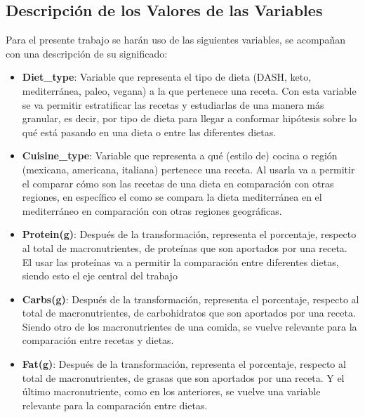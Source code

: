 \documentclass[12pt,a4paper]{article}
\begin{document}
    \subsection{Descripción de los Valores de las Variables}
    Para el presente trabajo se harán uso de las siguientes variables, se 
    acompañan con una descripción de su significado:
    \begin{itemize}[label=\textbullet]
        \item \textbf{Diet\_type}: Variable que representa el tipo de 
        dieta (DASH, keto, mediterránea, paleo, vegana) a la que 
        pertenece una receta. Con esta variable se va permitir estratificar 
        las recetas y estudiarlas de una manera más granular, es decir, 
        por tipo de dieta para llegar a conformar hipótesis sobre lo qué 
        está pasando en una dieta o entre las diferentes dietas.
        \item \textbf{Cuisine\_type}: Variable que representa a qué (estilo 
        de) cocina o región (mexicana, americana, italiana) pertenece una 
        receta. Al usarla va a permitir el comparar cómo son las recetas 
        de una dieta en comparación con otras regiones, en específico el 
        como se compara la dieta mediterránea en el mediterráneo en comparación 
        con otras regiones geográficas.
        \item \textbf{Protein(g)}: Después de la transformación, representa el 
        porcentaje, respecto al total de macronutrientes, de proteínas que son 
        aportados por una receta. El usar las proteínas va a permitir la 
        comparación entre diferentes dietas, siendo esto el eje central del trabajo
        \item \textbf{Carbs(g)}: Después de la transformación, representa el 
        porcentaje, respecto al total de macronutrientes, de carbohidratos que 
        son aportados por una receta. Siendo otro de los macronutrientes de una 
        comida, se vuelve relevante para la comparación entre recetas y dietas.
        \item \textbf{Fat(g)}: Después de la transformación, representa el 
        porcentaje, respecto al total de macronutrientes, de grasas que son 
        aportados por una receta. Y el último macronutriente, como en los 
        anteriores, se vuelve una variable relevante para la comparación entre dietas.
    \end{itemize}
\end{document}
